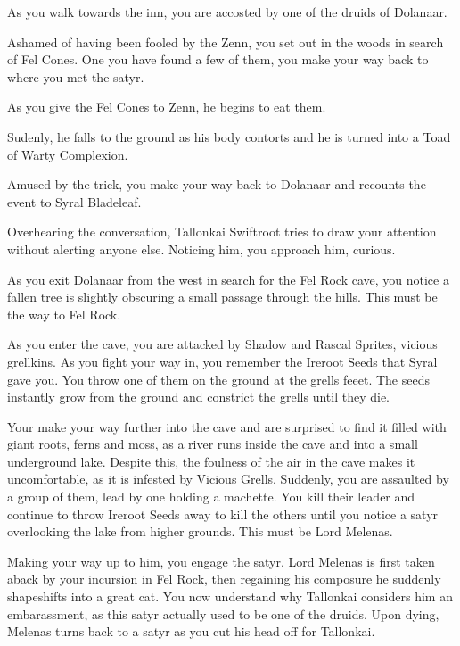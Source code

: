 As you walk towards the inn, you are accosted by one of the druids of Dolanaar.


Ashamed of having been fooled by the Zenn, you set out in the woods in search of Fel Cones. One you have found a few of them, you make your way back to where you met the satyr.


As you give the Fel Cones to Zenn, he begins to eat them.


Sudenly, he falls to the ground as his body contorts and he is turned into a Toad of Warty Complexion.


Amused by the trick, you make your way back to Dolanaar and recounts the event to Syral Bladeleaf.


Overhearing the conversation, Tallonkai Swiftroot tries to draw your attention without alerting anyone else. Noticing him, you approach him, curious.


As you exit Dolanaar from the west in search for the Fel Rock cave, you notice a fallen tree is slightly obscuring a small passage through the hills. This must be the way to Fel Rock.

As you enter the cave, you are attacked by Shadow and Rascal Sprites, vicious grellkins. As you fight your way in, you remember the Ireroot Seeds that Syral gave you. You throw one of them on the ground at the grells feeet. The seeds instantly grow from the ground and constrict the grells until they die.

Your make your way further into the cave and are surprised to find it filled with giant roots, ferns and moss, as a river runs inside the cave and into a small underground lake. Despite this, the foulness of the air in the cave makes it uncomfortable, as it is infested by Vicious Grells. Suddenly, you are assaulted by a group of them, lead by one holding a machette. You kill their leader and continue to throw Ireroot Seeds away to kill the others until you notice a satyr overlooking the lake from higher grounds. This must be Lord Melenas.

Making your way up to him, you engage the satyr. Lord Melenas is first taken aback by your incursion in Fel Rock, then regaining his composure he suddenly shapeshifts into a great cat. You now understand why Tallonkai considers him an embarassment, as this satyr actually used to be one of the druids. Upon dying, Melenas turns back to a satyr as you cut his head off for Tallonkai.

